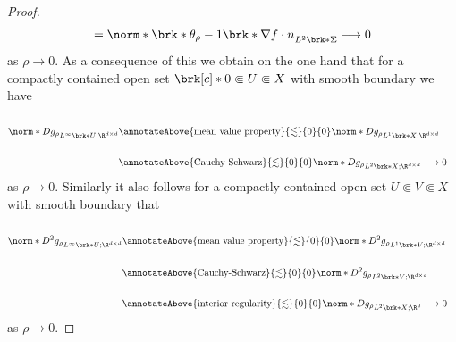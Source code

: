 \begin{proof}
\begin{align*}
    =\norm*{\brk*{\theta_\rho-1} \brk*{\nabla f\cdot n}}_{L^2\brk*{\Sigma}}\longrightarrow0
  \end{align*}
  as $\rho\to0$.
  As a consequence of this we obtain on the one hand that for a compactly contained open set
  $\brk[c]*{0}\Subset U\Subset X$ with smooth boundary we have
  \begin{align}
    \begin{aligned}
    \\
    \norm*{Dg_\rho}_{L^\infty\brk*{U;\R^{d\times d}}}
    &\annotateAbove{\text{mean value property}}{\lesssim}{0}{0} \norm*{Dg_\rho}_{L^1\brk*{X;\R^{d\times d}}}\\ \\
    &\annotateAbove{\text{Cauchy-Schwarz}}{\lesssim}{0}{0} \norm*{Dg_\rho}_{L^2\brk*{X;\R^{d\times d}}}
    \longrightarrow0
    \end{aligned}
    \label{eq:n3_thickening_cp_dg}
  \end{align}
  as $\rho\to0$.
  Similarly it also follows for a compactly contained open set $U\Subset V\Subset X$ with smooth boundary that
  \begin{align}
    \begin{aligned}
    \\
    \norm*{D^2g_\rho}_{L^\infty\brk*{U;\R^{d\times d}}}
    &\annotateAbove{\text{mean value property}}{\lesssim}{0}{0} \norm*{D^2g_\rho}_{L^1\brk*{V;\R^{d\times d}}}\\ \\
    &\annotateAbove{\text{Cauchy-Schwarz}}{\lesssim}{0}{0} \norm*{D^2g_\rho}_{L^2\brk*{V;\R^{d\times d}}}\\ \\
    &\annotateAbove{\text{interior regularity}}{\lesssim}{0}{0} \norm*{Dg_\rho}_{L^2\brk*{X;\R^{d}}}\longrightarrow0
    \end{aligned}
    \label{eq:n3_thickening_cp_d2g}
  \end{align}
  as $\rho\to0$.

\end{proof}
